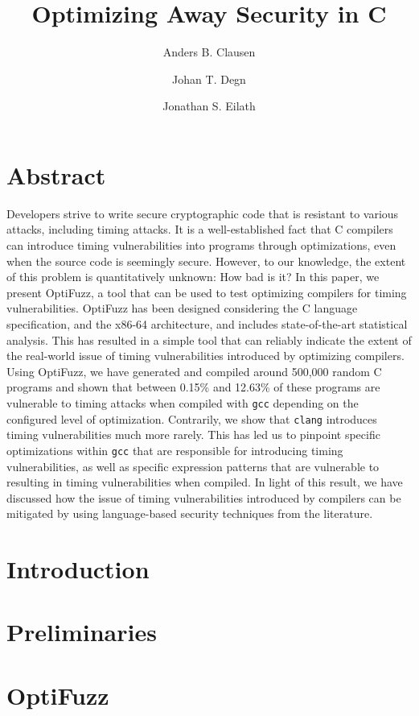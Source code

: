 \documentclass[10pt]{article}
\title{
  Optimizing Away Security in C
}
\author{Anders B. Clausen \and Johan T. Degn \and Jonathan S. Eilath}
\begin{document}
\maketitle
\thispagestyle{empty}

\section*{\centering Abstract}
{\fontsize{8pt}{1em}\selectfont
Developers strive to write secure cryptographic code that is resistant to various attacks, including timing attacks.
It is a well-established fact that C compilers can introduce timing vulnerabilities into programs through optimizations, even when the source code is seemingly secure.
However, to our knowledge, the extent of this problem is quantitatively unknown: 
How bad is it?
In this paper, we present OptiFuzz, a tool that can be used to test optimizing compilers for timing vulnerabilities.
OptiFuzz has been designed considering the C language specification, and the x86-64 architecture, and includes state-of-the-art statistical analysis.
This has resulted in a simple tool that can reliably indicate the extent of the real-world issue of timing vulnerabilities introduced by optimizing compilers.
Using OptiFuzz, we have generated and compiled around 500,000 random C programs and shown that between 0.15\% and 12.63\% of these programs are vulnerable to timing attacks when compiled with \texttt{gcc} depending on the configured level of optimization.
Contrarily, we show that \texttt{clang} introduces timing vulnerabilities much more rarely.
This has led us to pinpoint specific optimizations within \texttt{gcc} that are responsible for introducing timing vulnerabilities, as well as specific expression patterns that are vulnerable to resulting in timing vulnerabilities when compiled.
In light of this result, we have discussed how the issue of timing vulnerabilities introduced by compilers can be mitigated by using language-based security techniques from the literature.
}
\section{Introduction}


\section{Preliminaries}


\section{OptiFuzz}

\end{document}
